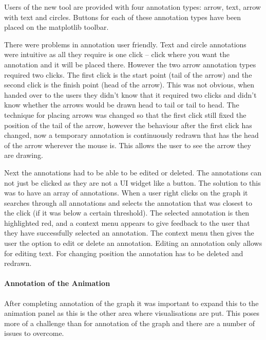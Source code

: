 Users of the new tool are provided with four annotation types: arrow, text, arrow with text and circles.  Buttons for each of these annotation types have been placed on the matplotlib toolbar.

There were problems in annotation user friendly.  Text and circle annotations were intuitive as all they require is one click -- click where you want the annotation and it will be placed there.  However the two arrow annotation types required two clicks.  The first click is the start point (tail of the arrow) and the second click is the finish point (head of the arrow).  This was not obvious, when handed over to the users they didn't know that it required two clicks and didn't know whether the arrows would be drawn head to tail or tail to head.  The technique for placing arrows was changed so that the first click still fixed the position of the tail of the arrow, however the behaviour after the first click has changed, now a temporary annotation is continuously redrawn that has the head of the arrow wherever the mouse is.  This allows the user to see the arrow they are drawing.

Next the annotations had to be able to be edited or deleted.  The annotations can not just be clicked as they are not a \ac{UI} widget like a button.  The solution to this was to have an array of annotations.  When a user right clicks on the graph it searches through all annotations and selects the annotation that was closest to the click (if it was below a certain threshold).  The selected annotation is then highlighted red, and a context menu appears to give feedback to the user that they have successfully selected an annotation.  The context menu then gives the user the option to edit or delete an annotation.  Editing an annotation only allows for editing text.  For changing position the annotation has to be deleted and redrawn.

\paragraph{Annotation of the Animation}

After completing annotation of the graph it was important to expand this to the animation panel as this is the other area where visualisations are put.  This poses more of a challenge than for annotation of the graph and there are a number of issues to overcome.

